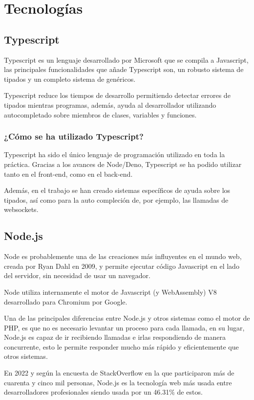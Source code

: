 \section{Tecnologías}


\subsection{Typescript}
Typescript \cite{typescript_docs} es un lenguaje desarrollado por Microsoft que se compila a Javascript, las principales funcionalidades que añade Typescript son, un robusto sistema de tipados y un completo sistema de genéricos.

Typescript reduce los tiempos de desarrollo permitiendo detectar errores de tipados mientras programas, además, ayuda al desarrollador utilizando autocompletado sobre miembros de clases, variables y funciones.

\subsubsection{¿Cómo se ha utilizado Typescript?}
Typescript ha sido el único lenguaje de programación utilizado en toda la práctica. Gracias a los avances de Node/Deno, Typescript se ha podido utilizar tanto en el front-end, como en el back-end.

Además, en el trabajo se han creado sistemas específicos de ayuda sobre los tipados, así como para la auto compleción de, por ejemplo, las llamadas de websockets.


\subsection{Node.js}
Node \cite{nodejs_docs} es probablemente una de las creaciones más influyentes en el mundo web, creada por Ryan Dahl en 2009, y permite ejecutar código Javascript en el lado del servidor, sin necesidad de usar un navegador.

Node utiliza internamente el motor de Javascript (y WebAssembly) V8 desarrollado para Chromium por Google.

Una de las principales diferencias entre Node.js y otros sistemas como el motor de PHP, es que no es necesario levantar un proceso para cada llamada, en su lugar, Node.js es capaz de ir recibiendo llamadas e irlas respondiendo de manera concurrente, esto le permite responder mucho más rápido y eficientemente que otros sistemas.

En 2022 y según la encuesta de StackOverflow \cite{so_survey} en la que participaron más de cuarenta y cinco mil personas, Node.js es la tecnología web más usada entre desarrolladores profesionales siendo usada por un 46.31\% de estos.

